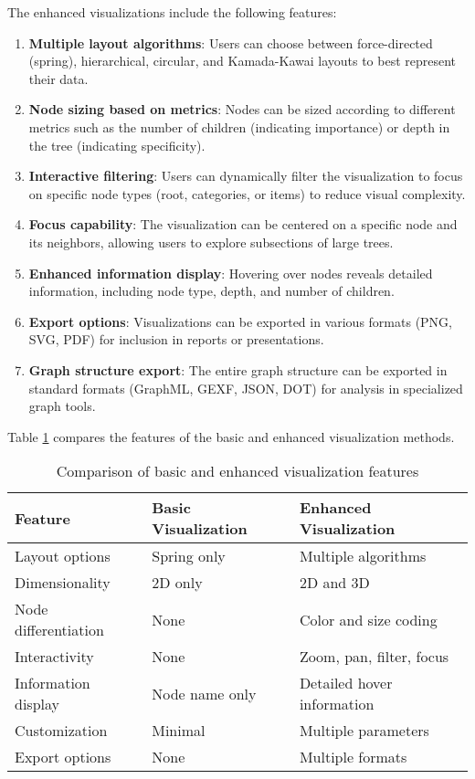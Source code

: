 \documentclass[conference]{IEEEtran}
\begin{document}
The enhanced visualizations include the following features:

\begin{enumerate}
    \item \textbf{Multiple layout algorithms}: Users can choose between force-directed (spring), hierarchical, circular, and Kamada-Kawai layouts to best represent their data.
    
    \item \textbf{Node sizing based on metrics}: Nodes can be sized according to different metrics such as the number of children (indicating importance) or depth in the tree (indicating specificity).
    
    \item \textbf{Interactive filtering}: Users can dynamically filter the visualization to focus on specific node types (root, categories, or items) to reduce visual complexity.
    
    \item \textbf{Focus capability}: The visualization can be centered on a specific node and its neighbors, allowing users to explore subsections of large trees.
    
    \item \textbf{Enhanced information display}: Hovering over nodes reveals detailed information, including node type, depth, and number of children.
    
    \item \textbf{Export options}: Visualizations can be exported in various formats (PNG, SVG, PDF) for inclusion in reports or presentations.
    
    \item \textbf{Graph structure export}: The entire graph structure can be exported in standard formats (GraphML, GEXF, JSON, DOT) for analysis in specialized graph tools.
\end{enumerate}

Table \ref{tab:visualization_comparison} compares the features of the basic and enhanced visualization methods.

\begin{table}[ht]
\centering
\caption{Comparison of basic and enhanced visualization features}
\label{tab:visualization_comparison}
\begin{tabular}{@{}lll@{}}
\toprule
\textbf{Feature} & \textbf{Basic Visualization} & \textbf{Enhanced Visualization} \\
\midrule
Layout options & Spring only & Multiple algorithms \\
Dimensionality & 2D only & 2D and 3D \\
Node differentiation & None & Color and size coding \\
Interactivity & None & Zoom, pan, filter, focus \\
Information display & Node name only & Detailed hover information \\
Customization & Minimal & Multiple parameters \\
Export options & None & Multiple formats \\
\bottomrule
\end{tabular}
\end{table}
\end{document}
